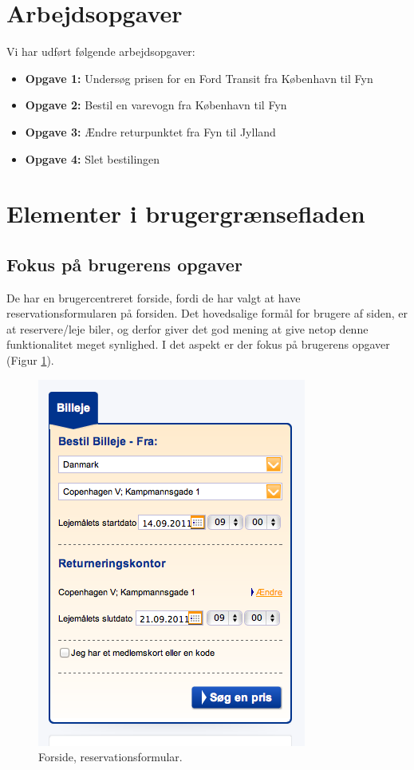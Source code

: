 \documentclass[a4paper]{article}
\begin{document}
\section{Arbejdsopgaver}
Vi har udført følgende arbejdsopgaver:
\begin{itemize}
\item{\textbf{Opgave 1:}}
    Undersøg prisen for en Ford Transit fra København til Fyn
\item{\textbf{Opgave 2:}}
    Bestil en varevogn fra København til Fyn
\item{\textbf{Opgave 3:}}
    Ændre returpunktet fra Fyn til Jylland
\item{\textbf{Opgave 4:}}
    Slet bestilingen
\end{itemize}

\section{Elementer i brugergrænsefladen}
\subsection{Fokus på brugerens opgaver}
De har en brugercentreret forside, fordi de har valgt at have
reservationsformularen på forsiden. Det hovedsalige formål for brugere af siden,
er at reservere/leje biler, og derfor giver det god mening at give netop denne
funktionalitet meget synlighed. I det aspekt er der fokus på brugerens opgaver
(Figur \ref{forside}).

\begin{figure}[htbp]
  \begin{center}
    \includegraphics[scale=.6]{1.png}
  \end{center}
  \caption{Forside, reservationsformular.}
  \label{forside}
\end{figure}
\end{document}
